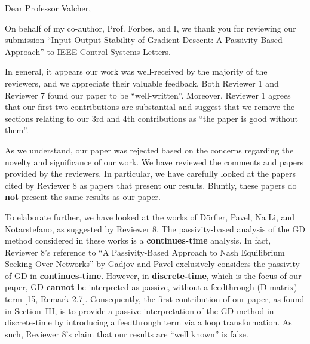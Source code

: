 \thispagestyle{empty}
\setcounter{page}{0}
\begin{flushleft}
    Dear Professor Valcher,

    On behalf of my co-author, Prof. Forbes, and I, we thank you for reviewing our submission ``Input-Output Stability of Gradient Descent: A Passivity-Based Approach'' to IEEE Control Systems Letters.

    In general, it appears our work was well-received by the majority of the reviewers, and we appreciate their valuable feedback. Both Reviewer 1 and Reviewer 7 found our paper to be ``well-written''. Moreover, Reviewer 1 agrees that our first two contributions are substantial and suggest that we remove the sections relating to our 3rd and 4th contributions as ``the paper is good without them''.
    
    As we understand, our paper was rejected based on the concerns regarding the novelty and significance of our work. We have reviewed the comments and papers provided by the reviewers. In particular, we have carefully looked at the papers cited by Reviewer 8 as papers that present our results. Bluntly, these papers do \textbf{not} present the same results as our paper.

    To elaborate further, we have looked at the works of Dörfler, Pavel, Na Li, and Notarstefano, as suggested by Reviewer 8. The passivity-based analysis of the GD method considered in these works is a \textbf{continues-time} analysis. In fact, Reviewer 8's reference to ``A Passivity-Based Approach to Nash Equilibrium Seeking Over Networks'' by Gadjov and Pavel exclusively considers the passivity of GD in \textbf{continues-time}. However, in \textbf{discrete-time}, which is the focus of our paper, GD \textbf{cannot} be interpreted as passive, without a feedthrough (D matrix) term [15, Remark 2.7]. Consequently, the first contribution of our paper, as found in Section~III, is to provide a passive interpretation of the GD method in discrete-time by introducing a feedthrough term via a loop transformation. As such, Reviewer 8's claim that our results are ``well known'' is false.


\end{flushleft}
